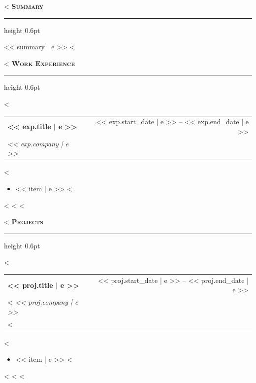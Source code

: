 \documentclass[10pt,a4paper]{article}
\newcommand{\sectionheader}[1]{%
    \vspace{6pt}%
    {\color{navyblue}\textsc{\textbf{#1}}}%
    \vspace{1pt}%
    {\color{rulegray}\hrule height 0.6pt}%
    \vspace{4pt}%
}
\newenvironment{cvitems}{%
    \begin{itemize}[leftmargin=1em, itemsep=1pt, parsep=0pt, topsep=2pt]%
}{%
    \end{itemize}%
}
\begin{document}
\begin{minipage}[t]{0.68\textwidth}

    <%
    \sectionheader{Summary}
    {\small << summary | e >>}
    \vspace{4pt}
    <%

    <%
    \sectionheader{Work Experience}
    <%
    \noindent
    \begin{tabularx}{\linewidth}{@{}X r@{}}
        {\small\textbf{<< exp.title | e >>}} & {\tiny\color{navyblue}<< exp.start_date | e >> -- << exp.end_date | e >>}\\
        {\small\textit{<< exp.company | e >>}} & \\
    \end{tabularx}
    <%
    \begin{cvitems}
        <%
        \item {\small << item | e >>}
        <%
    \end{cvitems}
    <%
    \vspace{4pt}
    <%
    <%

    <%
    \sectionheader{Projects}
    <%
    \noindent
    \begin{tabularx}{\linewidth}{@{}X r@{}}
        {\small\textbf{<< proj.title | e >>}} & {\tiny\color{navyblue}<< proj.start_date | e >> -- << proj.end_date | e >>}\\
        <%
        {\small\textit{<< proj.company | e >>}} & \\
        <%
    \end{tabularx}
    <%
    \begin{cvitems}
        <%
        \item {\small << item | e >>}
        <%
    \end{cvitems}
    <%
    \vspace{4pt}
    <%
    <%

\end{minipage}
\end{document}
